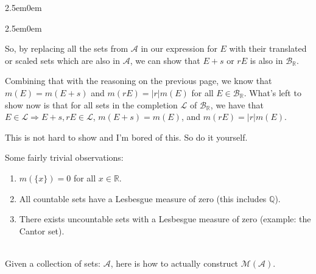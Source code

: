 \documentclass{book}
\newcommand{\myComment}{%
   \color{RawerSienna}%
   \fontsize{12}{14}\selectfont%
}
\newcommand{\teachComment}{
   \color{Orange}%
   \fontsize{12}{14}\selectfont%
}
\newenvironment{myIndent}{%
   \begin{adjustwidth}{2.5em}{0em}%
}{%
   \end{adjustwidth}%
}
\newcommand{\mySepTwo}[1][.]{%
   {\noindent\color{#1}{\rule{6.5in}{0.5mm}}}\\%
}
\newcommand{\retTwo}{\hfill\bigbreak}
\begin{document}
\begin{myIndent}
\begin{myIndent}
      So, by replacing all the sets from $\mathcal{A}$ in our expression for $E$ with their translated or scaled sets which are also in $\mathcal{A}$, we can show that $E + s$ or $rE$ is also in $\mathcal{B}_\mathbb{R}$.\retTwo

      Combining that with the reasoning on the previous page, we know that\\ $m(E) = m(E + s)$ and $m(rE) = |r|m(E)$ for all $E \in \mathcal{B}_\mathbb{R}$. What's left to show now is that for all sets in the completion $\mathcal{L}$ of $\mathcal{B}_{\mathbb{R}}$, we have that $E \in \mathcal{L} \Longrightarrow E + s, rE \in \mathcal{L}$, $m(E + s) = m(E)$, and $m(rE) = |r|m(E)$.\retTwo

      \myComment This is not hard to show and I'm bored of this. So do it yourself.\retTwo
   \end{myIndent}
\end{myIndent}

{\teachComment
Some fairly trivial observations:
\begin{enumerate}
   \item $m(\{x\}) = 0$ for all $x \in \mathbb{R}$.
   \item All countable sets have a Lesbesgue measure of zero (this includes $\mathbb{Q}$).
   \item There exists uncountable sets with a Lesbesgue measure of zero (example: the Cantor set).
\end{enumerate}}

\mySepTwo

Given a collection of sets: $\mathcal{A}$, here is how to actually construct $\mathcal{M}(\mathcal{A})$.\retTwo
\end{document}

